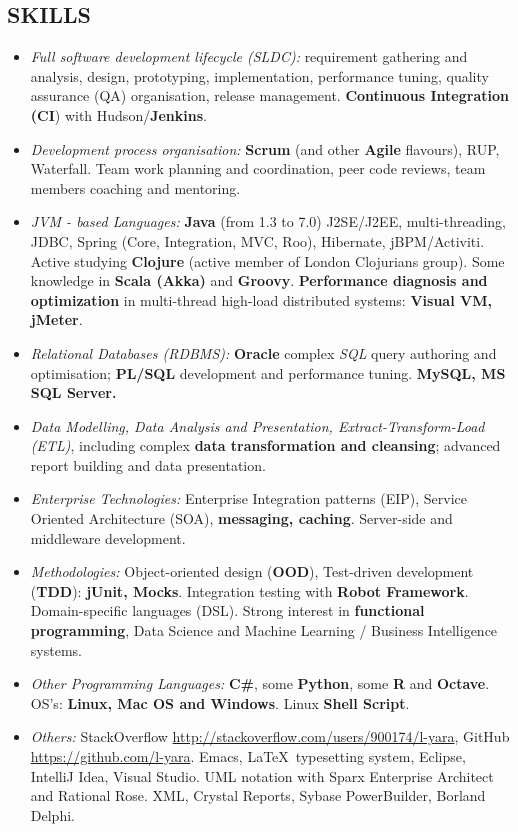 \documentclass{res}
\begin{document}
\begin{resume}
\section{SKILLS}
\begin{itemize}
  \item {\em Full software development lifecycle (SLDC):} requirement gathering and analysis, design, prototyping, implementation, performance tuning, quality assurance (QA) organisation, release management. {\bf Continuous Integration (CI}) with Hudson/{\bf Jenkins}.
  \item {\em Development process organisation:} {\bf Scrum} (and other {\bf Agile} flavours), RUP, Waterfall. Team work planning and coordination, peer code reviews, team members coaching and mentoring.
  \item {\em JVM - based Languages:} {\bf Java} (from 1.3 to 7.0) J2SE/J2EE, multi-threading, JDBC, Spring (Core, Integration, MVC, Roo), Hibernate, jBPM/Activiti. Active studying {\bf Clojure} (active member of London Clojurians group). Some knowledge in {\bf Scala (Akka)} and {\bf Groovy}. {\bf Performance diagnosis and optimization} in multi-thread high-load distributed systems: {\bf Visual VM, jMeter}.
  \item {\em Relational Databases (RDBMS):} {\bf Oracle} complex {\em SQL} query authoring and optimisation; {\bf PL/SQL} development and performance tuning. {\bf MySQL, MS SQL Server.}
  \item {\em Data Modelling, Data Analysis and Presentation, Extract-Transform-Load (ETL)}, including complex {\bf data transformation and cleansing}; advanced report building and data presentation.
  \item {\em Enterprise Technologies:} Enterprise Integration patterns (EIP), Service Oriented Architecture (SOA), {\bf messaging, caching}. Server-side and middleware development.
  \item {\em Methodologies:} Object-oriented design ({\bf OOD}), Test-driven development ({\bf TDD}): {\bf jUnit, Mocks}. Integration testing with {\bf Robot Framework}. Domain-specific languages (DSL). Strong interest in {\bf functional programming}, Data Science and Machine Learning / Business Intelligence systems.

  \item {\em Other Programming Languages:} {\bf C\#}, some {\bf Python}, some {\bf R} and {\bf Octave}. OS’s: {\bf Linux, Mac OS and Windows}. Linux {\bf Shell Script}.
  \item {\em Others:} StackOverflow \url{http://stackoverflow.com/users/900174/l-yara}, GitHub \url{https://github.com/l-yara}. Emacs, \LaTeX ~typesetting system, Eclipse, IntelliJ Idea, Visual Studio. UML notation with Sparx Enterprise Architect and Rational Rose. XML, Crystal Reports, Sybase PowerBuilder, Borland Delphi.
\end{itemize}


\end{resume}
\end{document}
